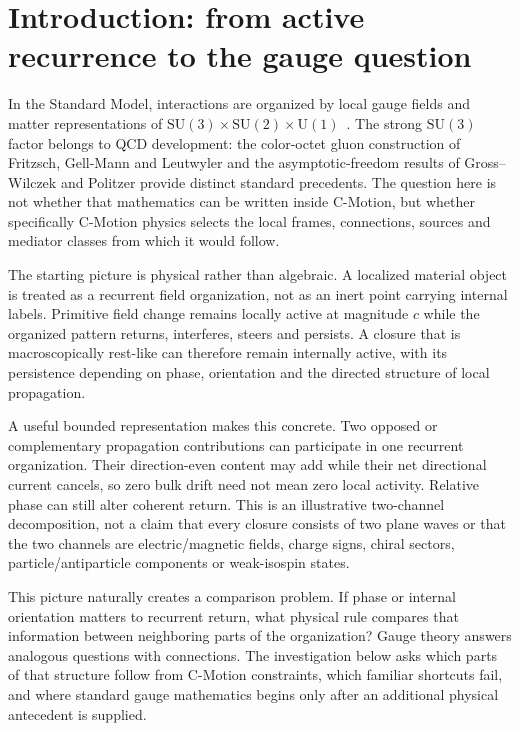 \documentclass[11pt]{article}
\theoremstyle{definition}
\newcommand{\cmotion}{\mbox{C-Motion}}
\newcommand{\Uone}{\mathrm{U}(1)}
\newcommand{\SUtwo}{\mathrm{SU}(2)}
\newcommand{\SUthree}{\mathrm{SU}(3)}
\begin{document}
\section{Introduction: from active recurrence to the gauge question}
\label{sec:introduction}

In the Standard Model, interactions are organized by local gauge fields and matter representations
of $\SUthree\times\SUtwo\times\Uone$~\cite{YangMills1954,Glashow1961,Weinberg1967,Salam1968}.
The strong $\SUthree$ factor belongs to QCD development: the color-octet
gluon construction of Fritzsch, Gell-Mann and Leutwyler \cite{FritzschGellMannLeutwyler1973}
and the asymptotic-freedom results of Gross--Wilczek and Politzer
\cite{GrossWilczek1973,Politzer1973} provide distinct standard precedents.
The question here is not whether that mathematics can be written inside \cmotion{}, but whether specifically C-Motion physics selects the local frames, connections, sources and mediator classes from which it would follow.

The starting picture is physical rather than algebraic.  A localized material object is treated as a recurrent field organization, not as an inert point carrying internal labels.  Primitive field change remains locally active at magnitude $c$ while the organized pattern returns, interferes, steers and persists.  A closure that is macroscopically rest-like can therefore remain internally active, with its persistence depending on phase, orientation and the directed structure of local propagation.

A useful bounded representation makes this concrete.  Two opposed or complementary propagation contributions can participate in one recurrent organization.  Their direction-even content may add while their net directional current cancels, so zero bulk drift need not mean zero local activity.  Relative phase can still alter coherent return.  This is an illustrative two-channel decomposition, not a claim that every closure consists of two plane waves or that the two channels are electric/magnetic fields, charge signs, chiral sectors, particle/antiparticle components or weak-isospin states.

This picture naturally creates a comparison problem.  If phase or internal orientation matters to recurrent return, what physical rule compares that information between neighboring parts of the organization?  Gauge theory answers analogous questions with connections.  The investigation below asks which parts of that structure follow from C-Motion constraints, which familiar shortcuts fail, and where standard gauge mathematics begins only after an additional physical antecedent is supplied.
\end{document}
